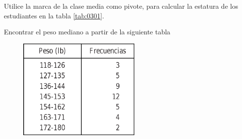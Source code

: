 \begin{problema}
	\label{problema:3.20}
	Utilice la marca de la clase media como pivote, para calcular la estatura de los estudiantes en la tabla \ref{tab:0301}.
\end{problema}



\begin{problema}
	\label{problema:3.28}
	Encontrar el peso mediano a partir de la siguiente tabla
	\begin{figure}[ht]
		\centering
		\includegraphics[height=5cm,keepaspectratio=true]{./images/tab0307.png}
		\label{tab:0307}
	\end{figure}
	
\end{problema}



